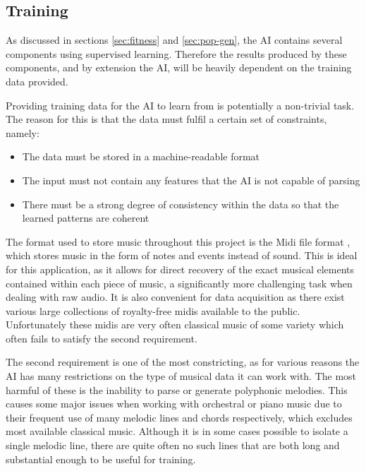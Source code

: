 \documentclass[ author={Stephen Livermore-Tozer},
				supervisor={Dr. Peter Flach},
				degree={MEng},
				title={Performing Algorithmic Co-composition Using Machine Learning},
				subtitle={},
				type={research},
				year={2016} ]{dissertation}
\begin{document}
	
	\subsection{Training}
	
	As discussed in sections \ref{sec:fitness} and \ref{sec:pop-gen}, the AI contains several components using supervised learning. Therefore the results produced by these components, and by extension the AI, will be heavily dependent on the training data provided.
	
	Providing training data for the AI to learn from is potentially a non-trivial task. The reason for this is that the data must fulfil a certain set of constraints, namely:
	
	\begin{itemize}
		\item The data must be stored in a machine-readable format
		\item The input must not contain any features that the AI is not capable of parsing
		\item There must be a strong degree of consistency within the data so that the learned patterns are coherent
	\end{itemize}
	
	The format used to store music throughout this project is the Midi file format \cite{swift1997brief}, which stores music in the form of notes and events instead of sound. This is ideal for this application, as it allows for direct recovery of the exact musical elements contained within each piece of music, a significantly more challenging task when dealing with raw audio. It is also convenient for data acquisition as there exist various large collections of royalty-free midis available to the public. Unfortunately these midis are very often classical music of some variety which often fails to satisfy the second requirement.
	
	The second requirement is one of the most constricting, as for various reasons the AI has many restrictions on the type of musical data it can work with. %
	The most harmful of these is the inability to parse or generate polyphonic melodies. This causes some major issues when working with orchestral or piano music due to their frequent use of many melodic lines and chords respectively, which excludes most available classical music. Although it is in some cases possible to isolate a single melodic line, there are quite often no such lines that are both long and substantial enough to be useful for training.
	
\end{document}

